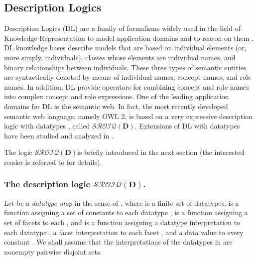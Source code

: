\documentclass[a4paper]{llncs}
\newcommand{\sroiqd}{\ensuremath{\mathcal{SROIQ}(\D)}}
\newcommand{\D}{\mathbf{D}}
\newcommand{\vipcomment}[1]{}
\begin{document}
\subsection{Description Logics}
Description Logics (DL) are a family of formalisms widely used in the field of Knowledge Representation to model application domains and to reason on them \cite{Baader03descriptionlogics}.
DL knowledge bases describe models that are based on individual elements (or, more simply, individuals), classes whose elements are individual names, and binary relationships between individuals. These three types of semantic entities are syntactically denoted by means of individual names, concept names, and role names. In addition, DL provide operators for combining concept and role names into complex concept and role expressions.
One of the leading application domains for DL is the semantic web. In fact, the most recently developed semantic web language, namely OWL 2, is based on a very expressive description logic with datatypes , called \sroiqd. Extensions of DL with datatypes have been studied and analyzed in \cite{Horrocks:2001a, Motik2008}.

\vipcomment{Datatype reasoning can be performed using an external datatype checking procedure. Standard DL tableau calculi can then be extended to handle datatypes by invoking the datatype checker as an oracle.  In particular, in \cite{Motik2008} it is shown that datatype checking in OWL 2 is NP-hard in the general case, but may become trivial in many (hopefully typical) cases. \marginpar{La parte in rosso potrebbe essere rimossa.} The authors also argue that certain datatypes listed as normative in the current OWL 2 Working Draft may be unsuitable from both a modeling and implementation perspective. They also present a modular datatype checking algorithm that can support any datatype for which it is possible to implement a small set of basic operations that we call a datatype handler and discuss how to implement datatype handlers for number and string datatypes}

The logic \sroiqd\space is briefly introduced in the next section (the interested reader is referred to \cite{Horrocks2006} for details).


\subsubsection{The description logic \sroiqd.}\label{sroiqd}
Let  be a \emph{datatype map} in the sense of \cite{Motik2008}, where   is a finite set of datatypes,  is a function assigning a set of constants  to each datatype ,  is a function assigning a set of facets  to each , and  is a function assigning a datatype interpretation  to each datatype , a facet interpretation  to each facet , and a data value  to every constant .  We shall assume that the interpretations of the datatypes in  are nonempty pairwise disjoint sets.
\end{document}
